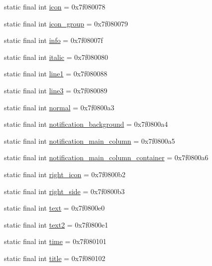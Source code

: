 \begin{DoxyCompactItemize}
static final int \mbox{\hyperlink{classandroid_1_1support_1_1graphics_1_1drawable_1_1R_1_1id_ae0a7affdbd0448660c604b248aeae54e}{icon}} = 0x7f080078
\item 
static final int \mbox{\hyperlink{classandroid_1_1support_1_1graphics_1_1drawable_1_1R_1_1id_abd07d96a991ba4fb2e5b58fa7200390e}{icon\+\_\+group}} = 0x7f080079
\item 
static final int \mbox{\hyperlink{classandroid_1_1support_1_1graphics_1_1drawable_1_1R_1_1id_ab008f7982ba0395901c5402d04046006}{info}} = 0x7f08007f
\item 
static final int \mbox{\hyperlink{classandroid_1_1support_1_1graphics_1_1drawable_1_1R_1_1id_ab3f1b9d2d2677cbbc18db586d7599aa7}{italic}} = 0x7f080080
\item 
static final int \mbox{\hyperlink{classandroid_1_1support_1_1graphics_1_1drawable_1_1R_1_1id_a85dc5f1d60bf411fcbb75962f798eceb}{line1}} = 0x7f080088
\item 
static final int \mbox{\hyperlink{classandroid_1_1support_1_1graphics_1_1drawable_1_1R_1_1id_a3e475586ebabb2808945680e4629b8bc}{line3}} = 0x7f080089
\item 
static final int \mbox{\hyperlink{classandroid_1_1support_1_1graphics_1_1drawable_1_1R_1_1id_a89ccce30f996f9eb78ef5db9f3a17071}{normal}} = 0x7f0800a3
\item 
static final int \mbox{\hyperlink{classandroid_1_1support_1_1graphics_1_1drawable_1_1R_1_1id_a27f2265bcdbeb02d1a337c7e4a3052d7}{notification\+\_\+background}} = 0x7f0800a4
\item 
static final int \mbox{\hyperlink{classandroid_1_1support_1_1graphics_1_1drawable_1_1R_1_1id_aabf00f5888a3194f048b6f29f102f04f}{notification\+\_\+main\+\_\+column}} = 0x7f0800a5
\item 
static final int \mbox{\hyperlink{classandroid_1_1support_1_1graphics_1_1drawable_1_1R_1_1id_aa32710627d3a79e215b72284bb4fea0c}{notification\+\_\+main\+\_\+column\+\_\+container}} = 0x7f0800a6
\item 
static final int \mbox{\hyperlink{classandroid_1_1support_1_1graphics_1_1drawable_1_1R_1_1id_aad264117d09758f8112d92656aada0a1}{right\+\_\+icon}} = 0x7f0800b2
\item 
static final int \mbox{\hyperlink{classandroid_1_1support_1_1graphics_1_1drawable_1_1R_1_1id_a5e84b5089abd6844223c1ef63cd3c51f}{right\+\_\+side}} = 0x7f0800b3
\item 
static final int \mbox{\hyperlink{classandroid_1_1support_1_1graphics_1_1drawable_1_1R_1_1id_ac94c4446921fcc3809b45b4192e599b8}{text}} = 0x7f0800e0
\item 
static final int \mbox{\hyperlink{classandroid_1_1support_1_1graphics_1_1drawable_1_1R_1_1id_a8497c10b90e0af758ebfd8117e7fed2f}{text2}} = 0x7f0800e1
\item 
static final int \mbox{\hyperlink{classandroid_1_1support_1_1graphics_1_1drawable_1_1R_1_1id_a7083b3897e0b0ff17169442245632f35}{time}} = 0x7f080101
\item 
static final int \mbox{\hyperlink{classandroid_1_1support_1_1graphics_1_1drawable_1_1R_1_1id_ae4c46d15d4cdd1b6504115837b34d591}{title}} = 0x7f080102
\end{DoxyCompactItemize}


